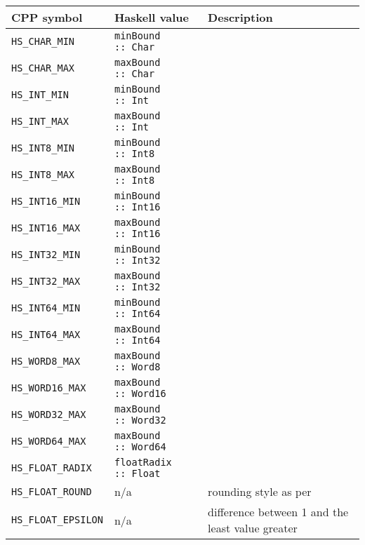 \documentclass[a4paper,twoside]{article}
\newcommand{\code}[1]{\texttt{#1}}      %
\begin{document}
\begin{table}
  \begin{center}
    \begin{tabular}{|l|l|p{30ex}|}
      \hline
      CPP symbol           & Haskell value & Description\\
      \hline\hline
      \code{HS\_CHAR\_MIN} & \code{minBound ::\ Char}
      & \\
      \hline
      \code{HS\_CHAR\_MAX} & \code{maxBound ::\ Char}
      & \\
      \hline
      \code{HS\_INT\_MIN} & \code{minBound ::\ Int}
      & \\
      \hline
      \code{HS\_INT\_MAX} & \code{maxBound ::\ Int}
      & \\
      \hline
      \code{HS\_INT8\_MIN} & \code{minBound ::\ Int8}
      & \\
      \hline
      \code{HS\_INT8\_MAX} & \code{maxBound ::\ Int8}
      & \\
      \hline
      \code{HS\_INT16\_MIN} & \code{minBound ::\ Int16}
      & \\
      \hline
      \code{HS\_INT16\_MAX} & \code{maxBound ::\ Int16}
      & \\
      \hline
      \code{HS\_INT32\_MIN} & \code{minBound ::\ Int32}
      & \\
      \hline
      \code{HS\_INT32\_MAX} & \code{maxBound ::\ Int32}
      & \\
      \hline
      \code{HS\_INT64\_MIN} & \code{minBound ::\ Int64}
      & \\
      \hline
      \code{HS\_INT64\_MAX} & \code{maxBound ::\ Int64}
      & \\
      \hline
      \code{HS\_WORD8\_MAX} & \code{maxBound ::\ Word8}
      & \\
      \hline
      \code{HS\_WORD16\_MAX} & \code{maxBound ::\ Word16}
      & \\
      \hline
      \code{HS\_WORD32\_MAX} & \code{maxBound ::\ Word32}
      & \\
      \hline
      \code{HS\_WORD64\_MAX} & \code{maxBound ::\ Word64}
      & \\
      \hline
      \code{HS\_FLOAT\_RADIX} & \code{floatRadix ::\ Float}
      & \\
      \hline
      \code{HS\_FLOAT\_ROUND} & n/a
      & rounding style as per~\cite{C99}\\
      \hline
      \code{HS\_FLOAT\_EPSILON} & n/a
      & difference between 1 and the least value greater

\end{tabular}
\end{center}
\end{table}
\end{document}
